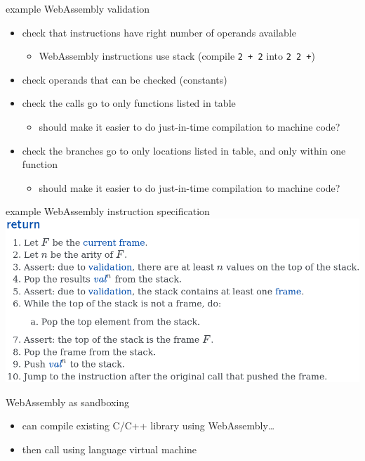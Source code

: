 \begin{frame}{example WebAssembly validation}
    \begin{itemize}
    \item check that instructions have right number of operands available
        \begin{itemize}
        \item WebAssembly instructions use stack (compile \texttt{2 + 2} into \texttt{2 2 +})
        \end{itemize}
    \item check operands that can be checked (constants)
    \item check the calls go to only functions listed in table
        \begin{itemize}
        \item should make it easier to do just-in-time compilation to machine code?
        \end{itemize}
    \item check the branches go to only locations listed in table, and only within one function
        \begin{itemize}
        \item should make it easier to do just-in-time compilation to machine code?
        \end{itemize}
    \end{itemize}
\end{frame}

\begin{frame}{example WebAssembly instruction specification}
\includegraphics[height=0.8\textheight]{../sandbox/wasm-return-spec}
\end{frame}

\begin{frame}{WebAssembly as sandboxing}
    \begin{itemize}
    \item can compile existing C/C++ library using WebAssembly\ldots
    \item then call using language virtual machine
    \end{itemize}
\end{frame}
